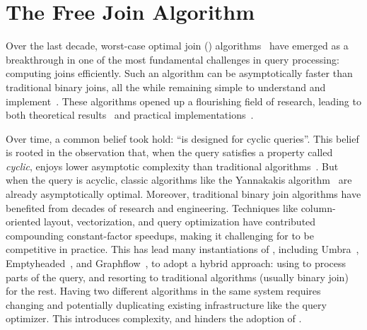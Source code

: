 \chapter{The Free Join Algorithm}
\label{chap:free-join}

Over the last decade, worst-case optimal join (\WCOJ)
algorithms~\cite{DBLP:conf/pods/NgoPRR12, DBLP:conf/icdt/Veldhuizen14,
  DBLP:journals/sigmod/NgoRR13, DBLP:conf/pods/000118} have emerged as
a breakthrough in one of the most fundamental challenges in query
processing: computing joins efficiently.  Such an algorithm can be
asymptotically faster than traditional binary joins, all the while
remaining simple to understand and
implement~\cite{DBLP:journals/sigmod/NgoRR13}.  These algorithms 
opened up a flourishing field of research, leading to both theoretical
results~\cite{DBLP:journals/sigmod/NgoRR13,DBLP:conf/pods/Khamis0S17}
and practical
implementations~\cite{DBLP:conf/icdt/Veldhuizen14,DBLP:journals/tods/AbergerLTNOR17,DBLP:journals/pvldb/FreitagBSKN20, DBLP:journals/pvldb/MhedhbiS19}.

Over time, a common belief took hold: 
  ``\WCOJ is designed for cyclic queries''.
This belief is rooted in the observation that,
 when the query satisfies a property called {\em cyclic},
  \WCOJ enjoys lower asymptotic complexity 
  than traditional algorithms~\cite{DBLP:journals/sigmod/NgoRR13}.
But when the query is acyclic, 
  classic algorithms like the Yannakakis algorithm~\cite{DBLP:conf/vldb/Yannakakis81} 
  are already asymptotically optimal. 
Moreover, traditional binary join algorithms have benefited from 
  decades of research and engineering.
Techniques like column-oriented layout, vectorization, 
  and query optimization
  have contributed compounding constant-factor speedups,
  making it challenging for \WCOJ to be competitive in practice.
This has lead many instantiations of \WCOJ,
  including Umbra~\cite{DBLP:journals/pvldb/FreitagBSKN20},
   Emptyheaded~\cite{DBLP:journals/tods/AbergerLTNOR17}, and Graphflow~\cite{DBLP:journals/pvldb/MhedhbiS19},
  to adopt a hybrid approach: 
  using \WCOJ to process parts of the query,
  and resorting to traditional algorithms (usually binary join) 
  for the rest.
Having two different algorithms in the same system
  requires changing and potentially duplicating existing infrastructure 
  like the query optimizer. 
This introduces complexity, and hinders the adoption of \WCOJ.

